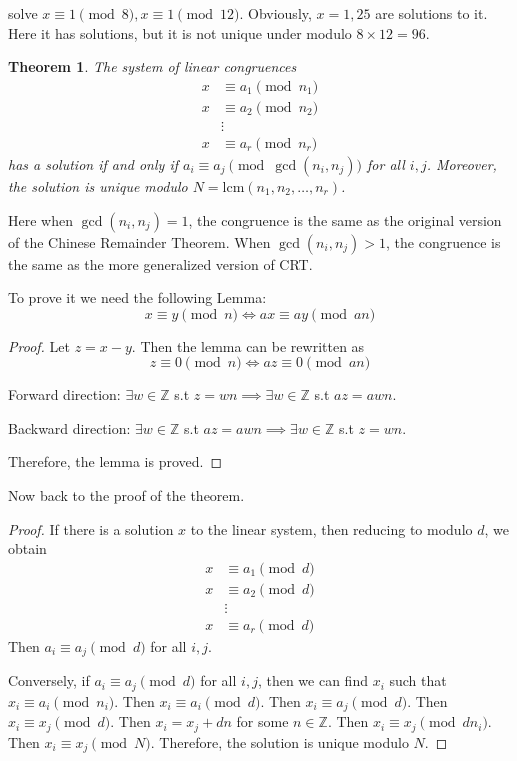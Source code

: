 \documentclass[letterpaper,12pt,oneside]{article}
\newtheorem{theorem}{Theorem}
\begin{document}
solve $x\equiv 1 \pmod 8, x\equiv 1 \pmod {12}$. Obviously, $x=1,25$ are solutions to it. Here it has solutions, but it is not unique under modulo $8\times 12=96$.

\begin{theorem}
    The system of linear congruences \begin{align*}
        x & \equiv a_1 \pmod {n_1} \\
        x & \equiv a_2 \pmod {n_2} \\
          & \vdots                 \\
        x & \equiv a_r \pmod {n_r}
    \end{align*}
    has a solution if and only if $a_i\equiv a_j \pmod {\gcd(n_i,n_j)}$ for all $i,j$. Moreover, the solution is unique modulo $N=\text{lcm}(n_1,n_2,\ldots,n_r)$.
\end{theorem}
Here when $\gcd(n_i,n_j)=1$, the congruence is the same as the original version of the Chinese Remainder Theorem. When $\gcd(n_i,n_j)>1$, the congruence is the same as the more generalized version of CRT.

To prove it we need the following Lemma:\[
    x\equiv y \pmod n \iff ax \equiv ay \pmod {an}
\]
\begin{proof}
    Let $z=x-y$. Then the lemma can be rewritten as \[
        z\equiv 0 \pmod n \iff az \equiv 0 \pmod {an}
    \]
    
    Forward direction: $\exists w\in \mathbb{Z}$ s.t $z=wn \implies \exists w\in \mathbb{Z}$ s.t $az=awn$.

    Backward direction: $\exists w\in \mathbb{Z}$ s.t $az=awn \implies \exists w\in \mathbb{Z}$ s.t $z=wn$.

    Therefore, the lemma is proved.
\end{proof}

Now back to the proof of the theorem.
\begin{proof}
    If there is a solution $x$ to the linear system, then reducing to modulo $d$, we obtain \begin{align*}
        x & \equiv a_1 \pmod d \\
        x & \equiv a_2 \pmod d \\
          & \vdots             \\
        x & \equiv a_r \pmod d
    \end{align*}
    Then $a_i\equiv a_j \pmod d$ for all $i,j$.

    Conversely, if $a_i\equiv a_j \pmod d$ for all $i,j$, then we can find $x_i$ such that $x_i\equiv a_i \pmod {n_i}$. Then $x_i\equiv a_i \pmod d$. Then $x_i\equiv a_j \pmod d$. Then $x_i\equiv x_j \pmod d$. Then $x_i=x_j+dn$ for some $n\in \mathbb{Z}$. Then $x_i\equiv x_j \pmod {dn_i}$. Then $x_i\equiv x_j \pmod N$. Therefore, the solution is unique modulo $N$.
\end{proof}
\end{document}
